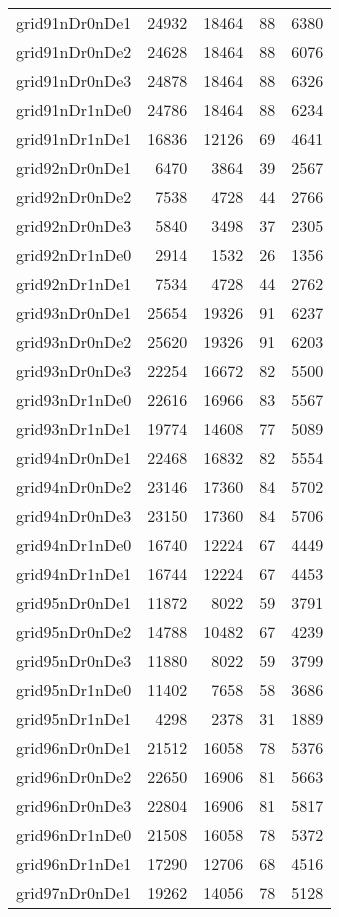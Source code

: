 \begin{longtable}{lrrrr}
grid91nDr0nDe1 & 24932 & 18464 & 88 & 6380 \\
grid91nDr0nDe2 & 24628 & 18464 & 88 & 6076 \\
grid91nDr0nDe3 & 24878 & 18464 & 88 & 6326 \\
grid91nDr1nDe0 & 24786 & 18464 & 88 & 6234 \\
grid91nDr1nDe1 & 16836 & 12126 & 69 & 4641 \\
grid92nDr0nDe1 & 6470 & 3864 & 39 & 2567 \\
grid92nDr0nDe2 & 7538 & 4728 & 44 & 2766 \\
grid92nDr0nDe3 & 5840 & 3498 & 37 & 2305 \\
grid92nDr1nDe0 & 2914 & 1532 & 26 & 1356 \\
grid92nDr1nDe1 & 7534 & 4728 & 44 & 2762 \\
grid93nDr0nDe1 & 25654 & 19326 & 91 & 6237 \\
grid93nDr0nDe2 & 25620 & 19326 & 91 & 6203 \\
grid93nDr0nDe3 & 22254 & 16672 & 82 & 5500 \\
grid93nDr1nDe0 & 22616 & 16966 & 83 & 5567 \\
grid93nDr1nDe1 & 19774 & 14608 & 77 & 5089 \\
grid94nDr0nDe1 & 22468 & 16832 & 82 & 5554 \\
grid94nDr0nDe2 & 23146 & 17360 & 84 & 5702 \\
grid94nDr0nDe3 & 23150 & 17360 & 84 & 5706 \\
grid94nDr1nDe0 & 16740 & 12224 & 67 & 4449 \\
grid94nDr1nDe1 & 16744 & 12224 & 67 & 4453 \\
grid95nDr0nDe1 & 11872 & 8022 & 59 & 3791 \\
grid95nDr0nDe2 & 14788 & 10482 & 67 & 4239 \\
grid95nDr0nDe3 & 11880 & 8022 & 59 & 3799 \\
grid95nDr1nDe0 & 11402 & 7658 & 58 & 3686 \\
grid95nDr1nDe1 & 4298 & 2378 & 31 & 1889 \\
grid96nDr0nDe1 & 21512 & 16058 & 78 & 5376 \\
grid96nDr0nDe2 & 22650 & 16906 & 81 & 5663 \\
grid96nDr0nDe3 & 22804 & 16906 & 81 & 5817 \\
grid96nDr1nDe0 & 21508 & 16058 & 78 & 5372 \\
grid96nDr1nDe1 & 17290 & 12706 & 68 & 4516 \\
grid97nDr0nDe1 & 19262 & 14056 & 78 & 5128 \\

\end{longtable}
